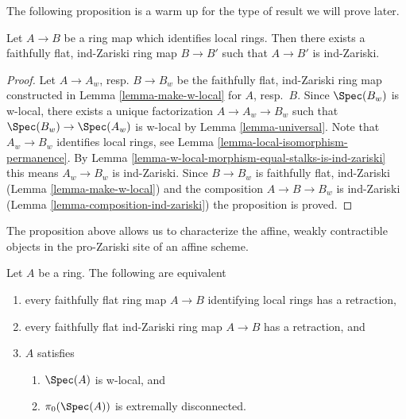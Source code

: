 \noindent
The following proposition is a warm up for the type of result
we will prove later.

\begin{proposition}
\label{proposition-maps-wich-identify-local-rings}
Let $A \to B$ be a ring map which identifies local rings.
Then there exists a faithfully flat, ind-Zariski ring map
$B \to B'$ such that $A \to B'$ is ind-Zariski.
\end{proposition}

\begin{proof}
Let $A \to A_w$, resp. $B \to B_w$ be the faithfully flat, ind-Zariski ring
map constructed in Lemma \ref{lemma-make-w-local} for $A$, resp.\ $B$.
Since $\Spec(B_w)$ is w-local, there exists a unique factorization
$A \to A_w \to B_w$ such that $\Spec(B_w) \to \Spec(A_w)$ is w-local
by Lemma \ref{lemma-universal}. Note that $A_w \to B_w$ identifies
local rings, see
Lemma \ref{lemma-local-isomorphism-permanence}.
By Lemma \ref{lemma-w-local-morphism-equal-stalks-is-ind-zariski}
this means $A_w \to B_w$ is ind-Zariski. Since $B \to B_w$ is
faithfully flat, ind-Zariski (Lemma \ref{lemma-make-w-local})
and the composition $A \to B \to B_w$ is ind-Zariski
(Lemma \ref{lemma-composition-ind-zariski})
the proposition is proved.
\end{proof}

\noindent
The proposition above allows us to characterize the affine, weakly contractible
objects in the pro-Zariski site of an affine scheme.

\begin{lemma}
\label{lemma-w-local-extremally-disconnected}
Let $A$ be a ring. The following are equivalent
\begin{enumerate}
\item every faithfully flat ring map $A \to B$ identifying local rings
has a retraction,
\item every faithfully flat ind-Zariski ring map $A \to B$ has a retraction, and
\item $A$ satisfies
\begin{enumerate}
\item $\Spec(A)$ is w-local, and
\item $\pi_0(\Spec(A))$ is extremally disconnected.
\end{enumerate}
\end{enumerate}
\end{lemma}

